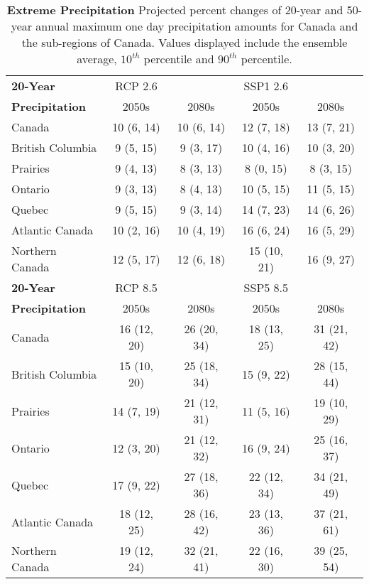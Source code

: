 \documentclass[]{scrartcl}
\begin{document}
\begin{appendices}
\begin{table}[t]
	\caption{\textbf{Extreme Precipitation} Projected percent changes of 20-year and 50-year annual maximum one day precipitation amounts for Canada and the sub-regions of Canada. Values displayed include the ensemble average, $10^{th}$ percentile and $90^{th}$ percentile.}\label{table:bc_rp20_pr}
	\begin{center}
		\begin{tabularx}{\linewidth}{|L|cc|cc|} 
			\hline
			\textbf{20-Year} & RCP 2.6 & & SSP1 2.6 &   \\
			\textbf{Precipitation}                & 2050s & 2080s & 2050s &2080s \\
			\hline
			Canada & 10 (6, 14) & 10 (6, 14) & 12 (7, 18) & 13 (7, 21) \\ 
			British Columbia & 9 (5, 15) & 9 (3, 17) & 10 (4, 16) & 10 (3, 20) \\ 
			Prairies & 9 (4, 13) & 8 (3, 13) & 8 (0, 15) & 8 (3, 15) \\ 
			Ontario & 9 (3, 13) & 8 (4, 13) & 10 (5, 15) & 11 (5, 15) \\ 
			Quebec & 9 (5, 15) & 9 (3, 14) & 14 (7, 23) & 14 (6, 26) \\ 
			Atlantic Canada & 10 (2, 16) & 10 (4, 19) & 16 (6, 24) & 16 (5, 29) \\ 
			Northern Canada & 12 (5, 17) & 12 (6, 18) & 15 (10, 21) & 16 (9, 27) \\ 	
			\hline
			\textbf{20-Year} & RCP 8.5 & & SSP5 8.5 &   \\
			\textbf{Precipitation}			& 2050s & 2080s & 2050s &2080s \\
			\hline
			Canada & 16 (12, 20) & 26 (20, 34) & 18 (13, 25) & 31 (21, 42) \\ 
			British Columbia & 15 (10, 20) & 25 (18, 34) & 15 (9, 22) & 28 (15, 44) \\ 
			Prairies & 14 (7, 19) & 21 (12, 31) & 11 (5, 16) & 19 (10, 29) \\ 
			Ontario & 12 (3, 20) & 21 (12, 32) & 16 (9, 24) & 25 (16, 37) \\ 
			Quebec & 17 (9, 22) & 27 (18, 36) & 22 (12, 34) & 34 (21, 49) \\ 
			Atlantic Canada & 18 (12, 25) & 28 (16, 42) & 23 (13, 36) & 37 (21, 61) \\ 
			Northern Canada & 19 (12, 24) & 32 (21, 41) & 22 (16, 30) & 39 (25, 54) \\ 	
			\hline
			\hline

\end{tabularx}
\end{center}
\end{table}
\end{appendices}
\end{document}
